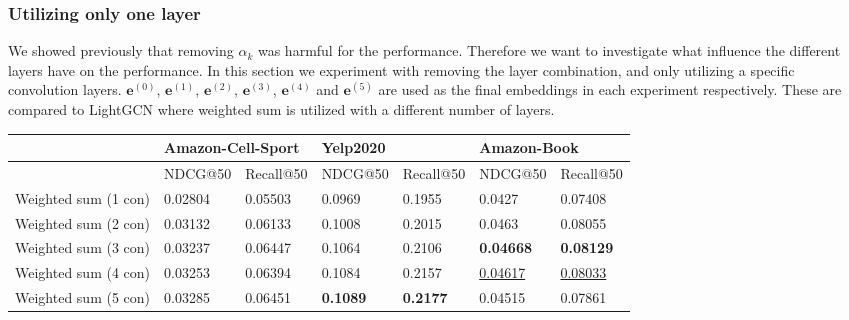 \subsubsection{Utilizing only one layer}
We showed previously that removing $\alpha_k$ was harmful for the performance. 
Therefore we want to investigate what influence the different layers have on the performance.
In this section we experiment with removing the layer combination, and only utilizing a specific convolution layers.
$\mathbf{e}^{(0)}$, $\mathbf{e}^{(1)}$, $\mathbf{e}^{(2)}$, $\mathbf{e}^{(3)}$, $\mathbf{e}^{(4)}$ and $\mathbf{e}^{(5)}$ are used as the final embeddings in each experiment respectively.
These are compared to LightGCN where weighted sum is utilized with a different number of layers.
\begin{table}[]
    \centering
    \begin{tabular}{|l|l|l|l|l|l|l|}
        \hline
                             & \multicolumn{2}{l|}{Amazon-Cell-Sport} & \multicolumn{2}{l|}{Yelp2020} & \multicolumn{2}{l|}{Amazon-Book}                                                                 \\ \hline
                             & NDCG@50                                & Recall@50                     & NDCG@50                          & Recall@50         & NDCG@50             & Recall@50           \\ \hline
        Weighted sum (1 con) & 0.02804                                & 0.05503                       & 0.0969                           & 0.1955            & 0.0427              & 0.07408             \\ \hline
        Weighted sum (2 con) & 0.03132                                & 0.06133                       & 0.1008                           & 0.2015            & 0.0463              & 0.08055             \\ \hline
        Weighted sum (3 con) & 0.03237                                & 0.06447                       & 0.1064                           & 0.2106            & \textbf{0.04668}    & \textbf{0.08129}    \\ \hline
        Weighted sum (4 con) & 0.03253                                & 0.06394                       & 0.1084                           & 0.2157            & \underline{0.04617} & \underline{0.08033} \\ \hline
        Weighted sum (5 con) & 0.03285                                & 0.06451                       & \textbf{0.1089}                  & \textbf{0.2177}   & 0.04515             & 0.07861             \\ \hline

\end{tabular}
\end{table}
